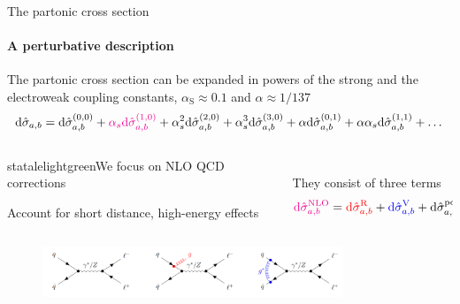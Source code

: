 \begin{frame} {The partonic cross section}
  \framesubtitle{A perturbative description}
\vspace{1em}
The partonic cross section can be expanded in powers of the strong and the electroweak coupling constants, $\alpha_{\text{S}}\approx 0.1$ and $\alpha \approx 1/137$
    \begin{equation*}
    \text{d} \hat{\sigma}_{a,b} = \text{d} \hat{\sigma}_{a,b}^{(0,0)} + \textcolor{magenta}{\alpha_s \text{d} \hat{\sigma}_{a,b}^{(1,0)}} + \alpha_s^2 \text{d} \hat{\sigma}_{a,b}^{(2,0)} + \alpha_s^3 \text{d} \hat{\sigma}_{a,b}^{(3,0)} + \alpha \text{d} \hat{\sigma}_{a,b}^{(0,1)} + \alpha \alpha_s \text{d} \hat{\sigma}_{a,b}^{(1,1)} + \dots 
    \end{equation*}

    \begin{columns}

    \begin{column}{0.6\textwidth}
    \begin{colorblock}[black]{statalelightgreen}{We focus on  NLO QCD corrections}
    \begin{center}
        Account for short distance, high-energy effects
    \end{center}
      \end{colorblock}   
    
    \end{column}

    \begin{column}{0.4\textwidth}
    \\
    They consist of three terms 
    \begin{equation*}
    \textcolor{magenta}{\mathrm{d} \hat{\sigma}_{a,b}^{\mathrm{NLO}}} = \textcolor{red}{\mathrm{d} \hat{\sigma}_{a,b}^{\mathrm{R}}} + \textcolor{blue}{\mathrm{d} \hat{\sigma}_{a,b}^{\mathrm{V}}} + \mathrm{d} \hat{\sigma}_{a,b}^{\mathrm{pdf}}
    \end{equation*}       
    
    \end{column}

    \end{columns}
    \begin{figure}
        \centering
        \includegraphics[width=0.8\textwidth]{imgs/real-and-virtual.png}
      \end{figure}    
\end{frame}




